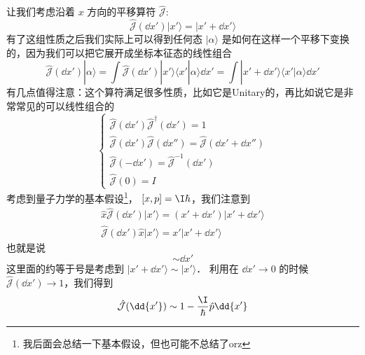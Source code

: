 让我们考虑沿着 $x$ 方向的平移算符 $\hat{\mathcal J}$: 
\begin{equation}
\hat{\mathcal{J}}(\dd{x'})|x'\rangle = |x'+\dd{x'}\rangle
\end{equation}
有了这组性质之后我们实际上可以得到任何态 $|\alpha\rangle$ 是如何在这样一个平移下变换的，因为我们可以把它展开成坐标本征态的线性组合
\begin{equation}
\hat{\mathcal{J}}(\dd{x'})|\alpha\rangle = \int\hat{\mathcal{J}}(\dd{x'})|x'\rangle\langle x'|\alpha\rangle \dd{x'} = \int|x'+\dd{x'}\rangle\langle x'|\alpha\rangle \dd{x'}
\end{equation}
有几点值得注意：这个算符满足很多性质，比如它是Unitary的，再比如说它是非常常见的可以线性组合的
\begin{equation}
\begin{cases}
\hat{\mathcal{J}}(\dd{x'})\hat{\mathcal{J}}^{\dagger}(\dd{x'}) = 1\\
\hat{\mathcal{J}}(\dd{x'})\hat{\mathcal{J}}(\dd{x''}) = \hat{\mathcal{J}}(\dd{x'} + \dd{x''})\\
\hat{\mathcal{J}}(-\dd{x'}) = \hat{\mathcal{J}}^{-1}(\dd{x'})\\
\hat{\mathcal{J}}(0) = I
\end{cases}
\end{equation}
考虑到量子力学的基本假设\footnote{我后面会总结一下基本假设，但也可能不总结了orz}， $[x,p] = \I\hbar$，我们注意到
\begin{gather}
\hat{x}\hat{\mathcal{J}}(\dd{x'})|x'\rangle = (x'+\dd{x'})|x'+\dd{x'}\rangle\\
\hat{\mathcal{J}}(\dd{x'})\hat{x}|x'\rangle = x'|x'+\dd{x'}\rangle
\end{gather}
也就是说
\begin{equation}
[\hat{x},\hat{\mathcal{J}}(\dd{x'})] \sim \dd{x'}
\end{equation}
这里面的约等于号是考虑到 $|x'+\dd{x'}\rangle \sim |x'\rangle$． 利用在 $\dd{x'}\rightarrow0$ 的时候 $\hat{\mathcal{J}}(\dd{x'})\rightarrow1$，我们得到
\begin{equation}
\hat{\mathcal{J}}(\dd{x'}) \sim 1-\frac{\I}{\hbar}\hat{p}\dd{x'}
\end{equation}

